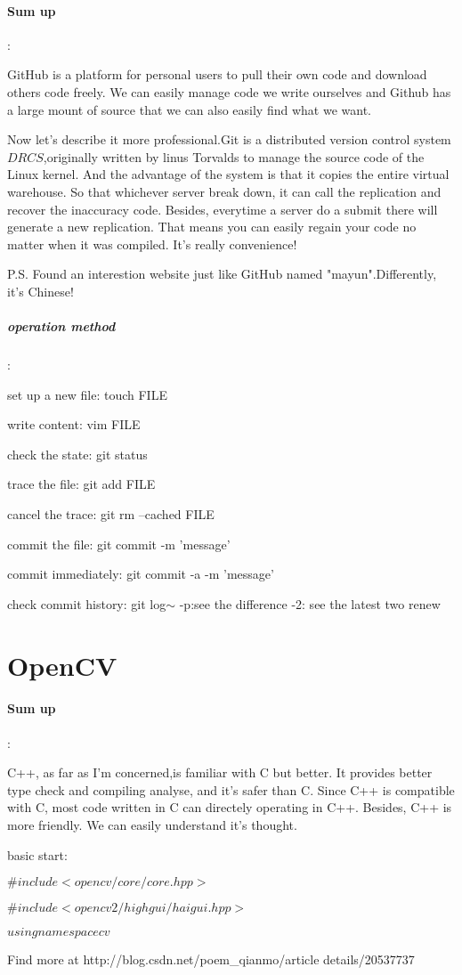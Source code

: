 \documentclass{report}
\begin{document}
	\paragraph{Sum up}:\par
	GitHub is a platform for personal users to pull their own code and download others code freely. We can easily manage code we write ourselves and Github has a large mount of source that we can also easily find what we want.\par
	Now let's describe it more professional.Git is a distributed version control system\(DRCS\),originally written by linus Torvalds to manage the source code of the Linux kernel. And the advantage of the system is that it copies the entire virtual warehouse. So that whichever server break down, it can call the replication and recover the inaccuracy code. Besides, everytime a server do a submit there will generate a new replication. That means you can easily regain your code no matter when it was compiled. It's really convenience!\par 
	P.S. Found an interestion website just like GitHub named "mayun".Differently, it's Chinese!
	\subparagraph{operation method}:\par
	set up a new file: touch FILE\par
	write content: vim FILE\par
	check the state: git status\par
	trace the file: git add FILE\par
	cancel the trace: git rm --cached FILE\par
	commit the file: git commit -m 'message'\par
	commit immediately: git commit -a -m 'message'\par
	check commit history: git log$\sim$ -p:see the difference -2: see the latest two renew
\section{OpenCV}
	\paragraph{Sum up}:\par	
	C++, as far as I'm concerned,is familiar with C but better. It provides better type check and compiling analyse, and it's safer than C. Since C++ is compatible with C, most code written in C can directely operating in C++. Besides, C++ is more friendly. We can easily understand it's thought.\par
	basic start:\par
	\(\#include <opencv/core/core.hpp>\)\par
	\(\#include <opencv2/highgui/haigui.hpp>\)\par 
	\(using namespace cv\)\par
	Find more at http://blog.csdn.net/poem\_qianmo/article details/20537737
\end{document}
